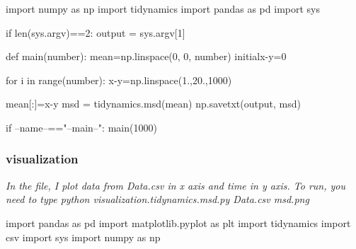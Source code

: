 \documentclass[12pt, a4paper, twoside]{report}
\begin{document}
import numpy as np\newline
import tidynamics\newline
import pandas as pd\newline
import sys\newline

if len(sys.argv)==2:\newline
\hspace*{10mm} output = sys.argv[1]\newline

def main(number):\newline
\hspace*{10mm} mean=np.linspace(0, 0, number)\newline
\hspace*{10mm} initialx-y=0 \newline

\hspace*{10mm} for i in range(number):\newline
\hspace*{20mm} x-y=np.linspace(1.,20.,1000)\newline

\hspace*{10mm}    mean[:]=x-y\newline
\hspace*{10mm}    msd = tidynamics.msd(mean)\newline
\hspace*{10mm}    np.savetxt(output, msd)\newline

if --name--=="--main--":\newline
\hspace*{10mm}    main(1000)
\newpage
\subsubsection{visualization}
\textit{In the file, I plot data from Data.csv in x axis and time in y axis.\newline
To run, you need to type python visualization.tidynamics.msd.py Data.csv msd.png}


import pandas as pd\newline
import matplotlib.pyplot as plt\newline
import tidynamics\newline
import csv\newline
import sys\newline
import numpy as np\newline
\end{document}
